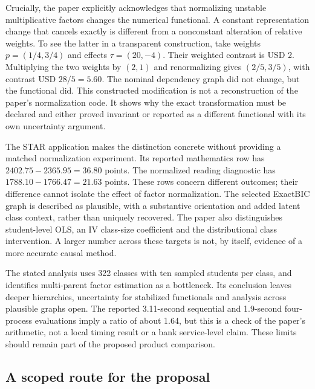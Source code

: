 Crucially, the paper explicitly acknowledges that normalizing unstable
multiplicative factors changes the numerical functional. A constant
representation change that cancels exactly is different from a
nonconstant alteration of relative weights. To see the latter in a
transparent construction, take weights $p=(1/4,3/4)$ and effects
$\tau=(20,-4)$. Their weighted contrast is USD 2. Multiplying the two
weights by $(2,1)$ and renormalizing gives $(2/5,3/5)$, with contrast
USD $28/5=5.60$. The nominal dependency graph did not change, but the
functional did. This constructed modification is not a reconstruction of
the paper's normalization code. It shows why the exact transformation must
be declared and either proved invariant or reported as a different
functional with its own uncertainty argument.
\citep{exec23_hierarchical_pipeline,exec23_structured_reference}

The STAR application makes the distinction concrete without providing a
matched normalization experiment. Its reported mathematics row has
$2402.75-2365.95=36.80$ points. The normalized reading diagnostic has
$1788.10-1766.47=21.63$ points. These rows concern different outcomes;
their difference cannot isolate the effect of factor normalization. The
selected ExactBIC graph is described as plausible, with a substantive
orientation and added latent class context, rather than uniquely recovered.
The paper also distinguishes student-level OLS, an IV class-size coefficient
and the distributional class intervention. A larger number across these
targets is not, by itself, evidence of a more accurate causal method.
\citep{exec23_hierarchical_pipeline,exec23_structured_reference}

The stated analysis uses 322 classes with ten sampled students per class,
and identifies multi-parent factor estimation as a bottleneck. Its
conclusion leaves deeper hierarchies, uncertainty for stabilized
functionals and analysis across plausible graphs open. The reported
3.11-second sequential and 1.9-second four-process evaluations imply a
ratio of about 1.64, but this is a check of the paper's arithmetic, not a
local timing result or a bank service-level claim. These limits should
remain part of the proposed product comparison.
\citep{exec23_hierarchical_pipeline,exec23_structured_reference}

\subsection{A scoped route for the proposal}
\label{exec23:structured-route}

